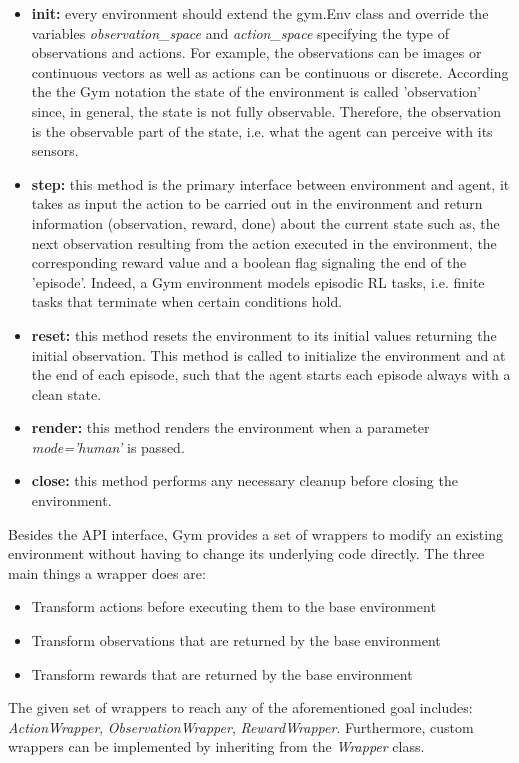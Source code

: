 \begin{center}
  \begin{minipage}{0.45\linewidth}
    
    \end{minipage}
\end{center}

\begin{itemize}
  \item \textbf{init:} every environment should extend the gym.Env class and override the variables \textit{observation\_space} and \textit{action\_space} specifying the type of observations and actions. For example, the observations can be images or continuous vectors as well as actions can be continuous or discrete. According the the Gym notation the state of the environment is called 'observation' since, in general, the state is not fully observable. Therefore, the observation is the observable part of the state, i.e. what the agent can perceive with its sensors.
  \item \textbf{step:} this method is the primary interface between environment and agent, it takes as input the action to be carried out in the environment and return information (observation, reward, done) about the current state such as, the next observation resulting from the action executed in the environment, the corresponding reward value and a boolean flag signaling the end of the 'episode'. Indeed, a Gym environment models episodic RL tasks, i.e. finite tasks that terminate when certain conditions hold.
  \item \textbf{reset:} this method resets the environment to its initial values returning the initial observation. This method is called to initialize the environment and at the end of each episode, such that the agent starts each episode always with a clean state.
  \item \textbf{render:} this method renders the environment when a parameter \textit{mode='human'} is passed.
  \item \textbf{close:} this method performs any necessary cleanup before closing the environment.
\end{itemize}
Besides the API interface, Gym provides a set of wrappers to modify an existing environment without having to change its underlying code directly. The three main things a wrapper does are:

\begin{itemize}
  \item Transform actions before executing them to the base environment
  \item Transform observations that are returned by the base environment
  \item Transform rewards that are returned by the base environment
\end{itemize}
The given set of wrappers to reach any of the aforementioned goal includes: \textit{ActionWrapper}, \textit{ObservationWrapper}, \textit{RewardWrapper}. Furthermore, custom wrappers can be implemented by inheriting from the \textit{Wrapper} class.

